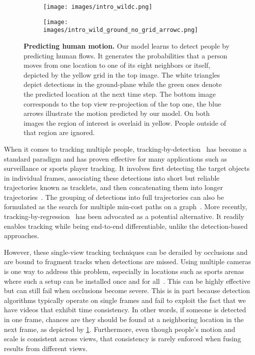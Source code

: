 \documentclass[10pt,twocolumn,letterpaper]{article}
\begin{document}
\begin{figure}[!ht]
  \centering
    \begin{subfigure}{.4\textwidth}
      \centering
      \texttt{[image: images/intro\_wildc.png]}
    \end{subfigure}\vskip 7pt
    \begin{subfigure}{.4\textwidth}
      \centering
      \texttt{[image: images/intro\_wild\_ground\_no\_grid\_arrowc.png]}
    \end{subfigure}
  
    \caption{\small \textbf{Predicting human motion.} Our model learns to detect people by predicting human flows. It generates the probabilities that a person moves from one location to one of its eight neighbors or itself, depicted by the yellow grid in the top image. The white triangles depict detections in the ground-plane while the green ones denote the predicted location at the next time step. The bottom image corresponds to the top view re-projection of the  top one, the blue arrows illustrate the motion predicted by our model. On both images the region of interest is overlaid in yellow. People outside of that region are ignored.}
    \label{fig:intro}
    \vspace{-0.5em}
  \end{figure}  


When it comes to tracking multiple people,  tracking-by-detection~\cite{Andriluka08}  has  become a  standard paradigm and has  proven effective  for many  applications  such  as surveillance  or  sports player tracking.  It involves first detecting  the target  objects in individual  frames,  associating  these  detections  into  short  but  reliable trajectories  known  as  tracklets,  and  then  concatenating  them  into  longer  trajectories~\cite{Long18,Henschel18,Keuper18,Yoon18,Kim18,Maksai19,Saleh21,Pang21b,Kim21a,Tokmakov21,gan2021self}. The grouping of detections into full trajectories  can also be formulated as the search for multiple min-cost paths on a graph~\cite{Berclaz11,Wang19f}. More recently,  tracking-by-regression~\cite{zhou2020tracking,Xu20b} has been advocated as a potential alternative. It readily enables tracking while being end-to-end differentiable, unlike the detection-based approaches.

However, these single-view tracking techniques can be derailed by occlusions and are bound to fragment tracks when detections are missed. Using multiple cameras is one way to address this problem, especially in locations such as sports arenas where such a setup can be installed once and for all~\cite{BenShitrit14,Xu16,Chavdarova18a}. This can be highly effective but can still fail when occlusions become severe. This is in part because detection algorithms typically operate on single frames and fail to exploit the fact that we have videos that exhibit time consistency. In other words, if someone is detected in one frame, chances are they should be found at a neighboring location in the next frame, as depicted by \cref{fig:intro}. Furthermore, even though people's motion and scale is consistent across views,  that consistency is rarely enforced when fusing results from different views.  
\end{document}
